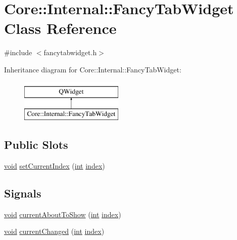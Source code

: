 \hypertarget{class_core_1_1_internal_1_1_fancy_tab_widget}{\section{Core\-:\-:Internal\-:\-:Fancy\-Tab\-Widget Class Reference}
\label{class_core_1_1_internal_1_1_fancy_tab_widget}
}


{\ttfamily \#include $<$fancytabwidget.\-h$>$}

Inheritance diagram for Core\-:\-:Internal\-:\-:Fancy\-Tab\-Widget\-:\begin{figure}[H]
\begin{center}
\leavevmode
\includegraphics[height=2.000000cm]{class_core_1_1_internal_1_1_fancy_tab_widget}
\end{center}
\end{figure}
\subsection*{Public Slots}
\begin{DoxyCompactItemize}
\item 
\hyperlink{group___u_a_v_objects_plugin_ga444cf2ff3f0ecbe028adce838d373f5c}{void} \hyperlink{group___core_plugin_ga388605bdeb2516f88d2712b6cffcbc87}{set\-Current\-Index} (\hyperlink{ioapi_8h_a787fa3cf048117ba7123753c1e74fcd6}{int} \hyperlink{glext_8h_ab47dd9958bcadea08866b42bf358e95e}{index})
\end{DoxyCompactItemize}
\subsection*{Signals}
\begin{DoxyCompactItemize}
\item 
\hyperlink{group___u_a_v_objects_plugin_ga444cf2ff3f0ecbe028adce838d373f5c}{void} \hyperlink{group___core_plugin_ga6e5760754641a9442d324865472720ca}{current\-About\-To\-Show} (\hyperlink{ioapi_8h_a787fa3cf048117ba7123753c1e74fcd6}{int} \hyperlink{glext_8h_ab47dd9958bcadea08866b42bf358e95e}{index})
\item 
\hyperlink{group___u_a_v_objects_plugin_ga444cf2ff3f0ecbe028adce838d373f5c}{void} \hyperlink{group___core_plugin_ga310fc2ab77a5e5a2f66c229aaab8568a}{current\-Changed} (\hyperlink{ioapi_8h_a787fa3cf048117ba7123753c1e74fcd6}{int} \hyperlink{glext_8h_ab47dd9958bcadea08866b42bf358e95e}{index})
\end{DoxyCompactItemize}
